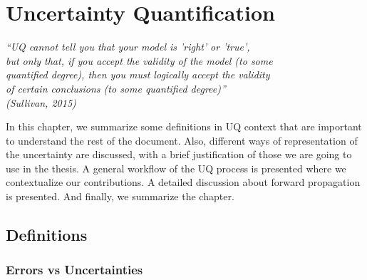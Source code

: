 

\chapter{Uncertainty Quantification}\label{cap:backgroud}


\begin{flushright}
	\textit{``UQ cannot tell you that your model is 'right' or 'true', \\
	but only that, if you accept the validity of the model (to some \\
	quantified degree), then you must logically accept the validity\\
	of certain conclusions (to some quantified degree)''\\
	(Sullivan, 2015)}
\end{flushright}

In this chapter, we summarize some definitions in UQ context that are important to understand the rest of the document. Also, different ways of representation of the uncertainty are discussed, with a brief justification of those we are going to use in the thesis. A general workflow of the UQ process is presented where we contextualize our contributions. A detailed discussion about forward propagation is presented. And finally, we summarize the chapter.

\section{Definitions}
\subsection{Errors vs Uncertainties}
